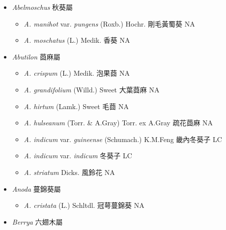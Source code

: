 
  \begin{itemize}
 \item[] \textit{Abelmoschus} 秋葵屬
                                
  \begin{itemize}
        \item[] \textit{A. manihot} var. \textit{pungens} (Roxb.) Hochr.  剛毛黃蜀葵   NA
        \item[] \textit{A. moschatus} (L.) Medik.  香葵   NA
  \end{itemize}
 \item[] \textit{Abutilon} 莔麻屬
                                
  \begin{itemize}
        \item[] \textit{A. crispum} (L.) Medik.  泡果莔   NA
        \item[] \textit{A. grandifolium} (Willd.) Sweet  大葉莔麻   NA
        \item[] \textit{A. hirtum} (Lamk.) Sweet  毛莔   NA
        \item[] \textit{A. hulseanum} (Torr. \& A.Gray) Torr. ex A.Gray  疏花莔麻   NA
        \item[] \textit{A. indicum} var. \textit{guineense} (Schumach.) K.M.Feng  畿內冬葵子   LC
        \item[] \textit{A. indicum} var. \textit{indicum}   冬葵子   LC
        \item[] \textit{A. striatum} Dicks.  風鈴花   NA
  \end{itemize}
 \item[] \textit{Anoda} 蔓錦葵屬
                                
  \begin{itemize}
        \item[] \textit{A. cristata} (L.) Schltdl.  冠萼蔓錦葵   NA
  \end{itemize}
 \item[] \textit{Berrya} 六翅木屬
                                

\end{itemize}
